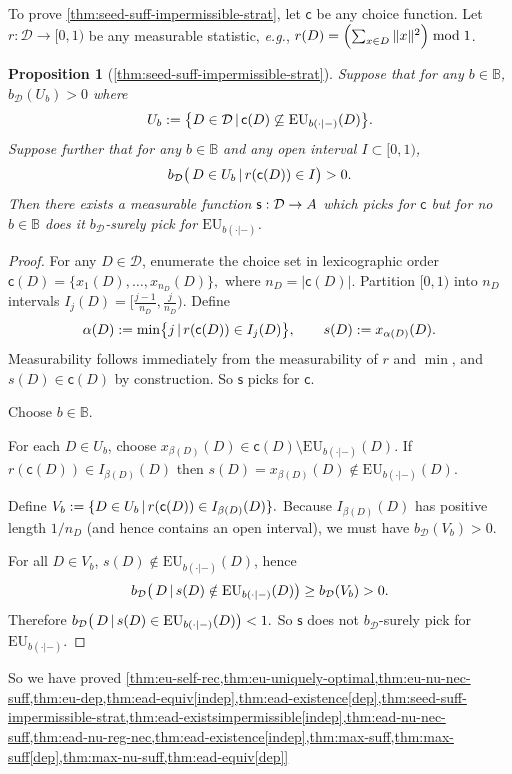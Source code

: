 \documentclass[a4paper,final]{article}
\newtheorem{proposition}[theorem]{Proposition}
\newcommand\A{\mathcal{A}}
\newcommand\EU{\mathrm{EU}}
\newcommand{\Decs}{\mathcal{D}}
\newcommand\s{\mathsf{s}}
\renewcommand\c{\mathsf{c}} %
\newcommand{\IB}{\mathbb{B}}
\renewcommand{\color}[1]{}
\newenvironment{colored}[1]{\leavevmode\color{#1}}{}
\newcommand\SetDelimiter[1][]{
	\nonscript\,#1\vert \allowbreak \nonscript\,\mathopen{}}
\providecommand\given{\SetDelimiter}
\newenvironment{CCM rewritten}
{\begingroup\color{blue}} %
{\endgroup}              %
\begin{document}
\begin{colored}{blue}

To prove \cref{thm:seed-suff-impermissible-strat}, let $\c$ be any choice function. Let $r:\Decs\rightarrow[0,1)$ be any measurable statistic, \textit{e.g.},  $r(D)=\Bigl(\sum_{x\in D}\|x\|^{2}\Bigr)\bmod 1$. 

\begin{proposition}[\cref{thm:seed-suff-impermissible-strat}]
Suppose that for any $b\in\IB$, $b_\Decs(U_b)>0$ where 
\[
U_b:=\bigl\{D\in\Decs\given \c(D)\not \subseteq\EU_{b(\cdot|-)}(D)\bigr\}.
\] 
Suppose further that for any $b\in\IB$ and any open interval $I\subset[0,1)$, 
\[
b_\Decs\bigl(\,D\in U_b\given r(\c(D))\in I \bigr)>0.
\]
Then there exists a measurable function
$
  \s:\Decs\to\mathbb \A
$
which picks for $\c$ but for no $b\in\IB$ does it $b_\Decs$-surely pick for $\EU_{b(\cdot|-)}$.

\end{proposition}

\begin{proof}
For any $D\in\Decs$, enumerate the choice set in lexicographic order
$
  \c(D)=\{x_{1}(D),\dots,x_{n_D}(D)\},
$
where $n_D=|\c(D)|$. Partition $[0,1)$ into $n_D$ intervals
$
  I_{j}(D)=\bigl[\tfrac{j-1}{n_D},\tfrac{j}{n_D}\bigr)
$.
Define
\[
\alpha(D):=\min\bigl\{j\given r(\c(D))\in I_{j}(D)\bigr\},
  \qquad
  s(D):=x_{\alpha(D)}(D).
\]
Measurability follows immediately from the measurability of $r$ and $\min$, and $s(D)\in\c(D)$ by construction. So $\s$ picks for $\c$.

Choose $b\in\IB$.


For each $D\in U_b$, choose
$x_{\beta(D)}(D)\in \c(D)\setminus\EU_{b(\cdot|-)}(D)$.
If $r(\c(D))\in I_{\beta(D)}(D)$ then $s(D)=x_{\beta(D)}(D)\notin\EU_{b(\cdot|-)}(D)$.

Define
$
 V_b:=\{D\in U_b\given r(\c(D))\in I_{\beta(D)}(D)\}.
$
Because $I_{\beta(D)}(D)$ has positive length $1/n_D$ (and hence contains an open interval), we must have $b_\Decs(V_b)>0$.

For all $D\in V_b$, $s(D)\notin\EU_{b(\cdot|-)}(D)$, hence
\[
b_\Decs\bigl(\,D\given s(D)\notin\EU_{b(\cdot|-)}(D)\bigr)\ge b_\Decs(V_b)>0.
\]
Therefore
$
b_\Decs\bigl(\,D\given s(D)\in\EU_{b(\cdot|-)}(D)\bigr)<1.
$
So $\s$ does not $b_\Decs$-surely pick for $\EU_{b(\cdot|-)}$.

\end{proof}
\end{colored}

So we have proved \cref{thm:eu-self-rec,thm:eu-uniquely-optimal,thm:eu-nu-nec-suff,thm:eu-dep,thm:ead-equiv[indep],thm:ead-existence[dep],thm:seed-suff-impermissible-strat,thm:ead-existsimpermissible[indep],thm:ead-nu-nec-suff,thm:ead-nu-reg-nec,thm:ead-existence[indep],thm:max-suff,thm:max-suff[dep],thm:max-nu-suff,thm:ead-equiv[dep]}
\end{document}
